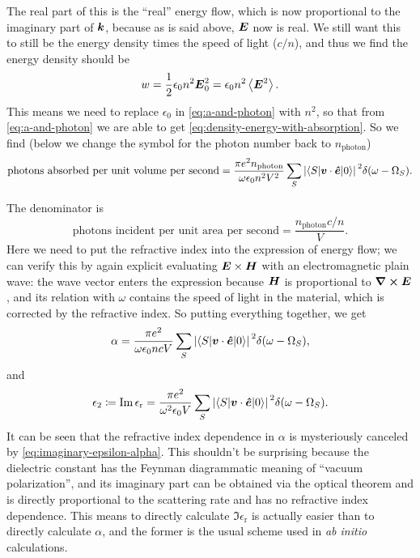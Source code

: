 \documentclass[hyperref, a4paper, 12pt]{report}
\newcommand*{\abinitio}{\textit{ab initio}}
\newcommand*{\epsr}{\epsilon_{\text{r}}}
\begin{document}
The real part of this is the ``real'' energy flow,
which is now proportional to the imaginary part of $\vb*{k}$, 
because as is said above, $\vb*{E}$ now is real.
We still want this to still be 
the energy density times the speed of light ($c / n$),
and thus we find the energy density should be 
\begin{equation}
    w = \frac{1}{2} \epsilon_0 n^2 \vb*{E}_0^2 = \epsilon_0 n^2 \expval{\vb*{E}^2}.
    \label{eq:density-energy-with-absorption}
\end{equation}
This means we need to replace $\epsilon_0$ in \eqref{eq:a-and-photon}
with $n^2$,
so that from \eqref{eq:a-and-photon} we are able to get \eqref{eq:density-energy-with-absorption}.
So we find (below we change the symbol for the photon number 
back to $n_{\text{photon}}$)
\begin{equation}
    \text{photons absorbed per unit volume per second} 
    = \frac{\pi e^2 n_{\text{photon}}}{\omega \epsilon_0 n^2 V^2} 
    \sum_S \abs*{\mel**{S}{\vb*{v} \cdot \vu*{e}}{0}}^2 \delta(\omega - \Omega_S).
\end{equation}

The denominator is 
\[
    \text{photons incident per unit area per second} = \frac{n_{\text{photon}} c / n}{V}.
\]
Here we need to put the refractive index into 
the expression of energy flow;
we can verify this by again explicit evaluating $\vb*{E} \times \vb*{H}$
with an electromagnetic plain wave: 
the wave vector enters the expression 
because $\vb*{H}$ is proportional to $\curl{\vb*{E}}$,
and its relation with $\omega$ contains 
the speed of light in the material,
which is corrected by the refractive index.
So putting everything together, we get 
\begin{equation}
    \alpha = \frac{\pi e^2}{\omega \epsilon_0 n c V} \sum_S \abs*{\mel**{S}{\vb*{v} \cdot \vu*{e}}{0}}^2 \delta(\omega - \Omega_S),
\end{equation}
and 
\begin{equation}
    \epsilon_2 \coloneqq \Im \epsr = \frac{\pi e^2}{\omega^2 \epsilon_0 V} 
        \sum_S \abs*{\mel**{S}{\vb*{v} \cdot \vu*{e}}{0}}^2 \delta(\omega - \Omega_S).
    \label{eq:light-matter.epsilon-img}
\end{equation}
It can be seen that the refractive index dependence in $\alpha$ 
is mysteriously canceled by \eqref{eq:imaginary-epsilon-alpha}.
This shouldn't be surprising 
because the dielectric constant has the Feynman diagrammatic meaning of 
``vacuum polarization'',
and its imaginary part can be obtained via the optical theorem
and is directly proportional to the scattering rate 
and has no refractive index dependence.
This means to directly calculate $\Im \epsilon_{\text{r}}$ is actually easier 
than to directly calculate $\alpha$,
and the former is the usual scheme used in \abinitio{} calculations.
\end{document}
